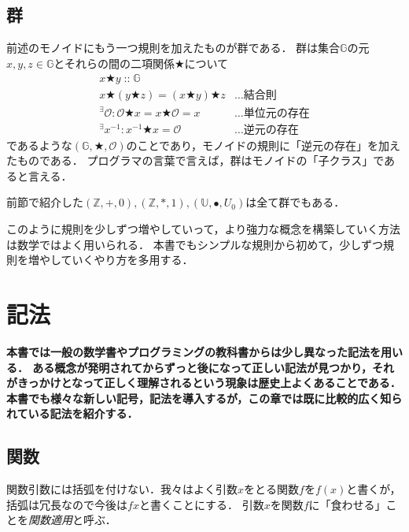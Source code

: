 \documentclass[twocolumn]{jsbook}
\newcommand{\keyword}[1]{\emph{#1}}
\newenvironment{leader}{\begingroup\bf}{\endgroup}
\newcommand{\istypeof}{\mathop{::}}
\newcommand{\mathbinaryop}{\bigstar}
\newcommand{\mathidentity}{\mathcal{O}}
\newcommand{\mathsetname}[1]{\mathbb{#1}}
\newcommand{\mathtriple}[3]{(#1,#2,#3)}
\newcommand{\mathcompose}{\bullet}
\begin{document}
\section{群}
前述のモノイドにもう一つ規則を加えたものが群である．
群は集合$\mathsetname{G}$の元$x,y,z\in\mathsetname{G}$とそれらの間の二項関係$\mathbinaryop$について
\begin{align}
x\mathbinaryop y\istypeof\mathsetname{G}\\
x\mathbinaryop(y\mathbinaryop z)=(x\mathbinaryop y)\mathbinaryop z&\dots\text{結合則}\\
{}^\exists\mathidentity:\mathidentity\mathbinaryop x=x\mathbinaryop\mathidentity=x&\dots\text{単位元の存在}\\
{}^\exists x^{-1}:x^{-1}\mathbinaryop x=\mathidentity&\dots\text{逆元の存在}
\end{align}
であるような$\mathtriple{\mathsetname{G}}{\mathbinaryop}{\mathidentity}$のことであり，モノイドの規則に「逆元の存在」を加えたものである．
プログラマの言葉で言えば，群はモノイドの「子クラス」であると言える．

前節で紹介した$\mathtriple{\mathsetname{Z}}{+}{0},\mathtriple{\mathsetname{Z}}{*}{1},\mathtriple{\mathsetname{U}}{\mathcompose}{U_0}$は全て群でもある．

このように規則を少しずつ増やしていって，より強力な概念を構築していく方法は数学ではよく用いられる．
本書でもシンプルな規則から初めて，少しずつ規則を増やしていくやり方を多用する．


\chapter{記法}

\begin{leader}
本書では一般の数学書やプログラミングの教科書からは少し異なった記法を用いる．
ある概念が発明されてからずっと後になって正しい記法が見つかり，それがきっかけとなって正しく理解されるという現象は歴史上よくあることである．
本書でも様々な新しい記号，記法を導入するが，この章では既に比較的広く知られている記法を紹介する．
\end{leader}


\section{関数}

関数引数には括弧を付けない．我々はよく引数$x$をとる関数$f$を$f(x)$と書くが，括弧は冗長なので今後は$fx$と書くことにする．
引数$x$を関数$f$に「食わせる」ことを\keyword{関数適用}と呼ぶ．
\end{document}
